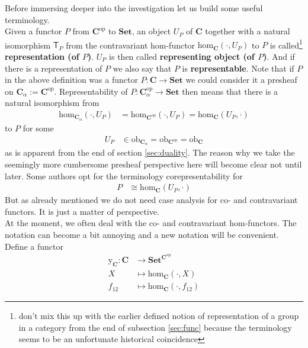 Before immersing deeper into the investigation let us build some useful terminology.
\\
Given a functor $P$ from $\mathbf{C}^{\mathrm{op}}$ to $\mathbf{Set}$, an object $U_{P}$ of $\mathbf{C}$ together with a natural isomorphism $\mathsf{T}_{P}$ from the contravariant hom-functor $\mathrm{hom}_{\mathbf{C}}(\cdot,U_{P})$ to $P$ is called\footnote{don't mix this up with the earlier defined notion of representation of a group in a category from the end of subsection \ref{sec:func} because the terminology seems to be an unfortunate historical coincidence} \textbf{representation (of $P$)}. $U_{P}$ is then called \textbf{representing object (of $P$)}. And if there is a representation of $P$ we also say that $P$ is \textbf{representable}. Note that if $P$ in the above definition was a functor $P \colon \mathbf{C} \rightarrow \mathbf{Set}$ we could consider it a presheaf on $\mathbf{C}_{\alpha} := \mathbf{C}^{\mathrm{op}}$. Representability of $P \colon \mathbf{C}_{\alpha}^{\mathrm{op}} \rightarrow \mathbf{Set}$ then means that there is a natural isomorphism from
\begin{align*}
  \mathrm{hom}_{\mathbf{C}_{\alpha}}(\cdot,U_{P})
  &=
  \mathrm{hom}_{\mathbf{C}^{\mathrm{op}}}(\cdot,U_{P})
  =
  \mathrm{hom}_{\mathbf{C}}(U_{P},\cdot)
\end{align*}
to $P$ for some
\begin{align*}
  U_{P}
  &\in
  \mathrm{ob}_{\mathbf{C}_{\alpha}}
  =
  \mathrm{ob}_{\mathbf{C}^{\mathrm{op}}}
  =
  \mathrm{ob}_{\mathbf{C}}
\end{align*}
as is apparent from the end of section \ref{sec:duality}. The reason why we take the seemingly more cumbersome presheaf perspective here will become clear not until later. Some authors opt for the terminology {\glqq}corepresentability{\grqq} for
\begin{align*}
  P
  &\cong
  \mathrm{hom}_{\mathbf{C}}(U_{P},\cdot)
\end{align*}
But as already mentioned we do not need case analysis for co- and contravariant functors. It is just a matter of perspective.
\\
At the moment, we often deal with the co- and contravariant hom-functors. The notation can become a bit annoying and a new notation will be convenient. Define a functor
\begin{align*}
  \mathrm{y}_{\mathbf{C}}
  \colon
  \mathbf{C}
  &\rightarrow
  \mathbf{Set}^{\mathbf{C}^{\mathrm{op}}}
  \\
  X
  &\mapsto
  \mathrm{hom}_{\mathbf{C}}(\cdot,X)
  \\
  f_{12}
  &\mapsto
  \mathrm{hom}_{\mathbf{C}}(\cdot,f_{12})
\end{align*}

